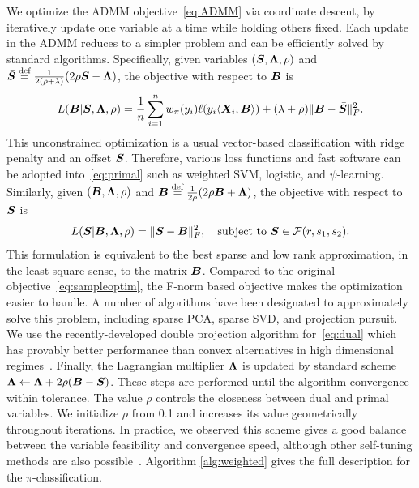 \documentclass[11pt]{article}
\theoremstyle{plain}
\theoremstyle{definition}
\begin{document}
We optimize the ADMM objective~\eqref{eq:ADMM} via coordinate descent, by iteratively update one variable at a time while holding others fixed. Each update in the ADMM reduces to a simpler problem and can be efficiently solved by standard algorithms. Specifically, given variables $(\bm S,\bm{\Lambda},\rho)$ and $\bar {\bm S}\stackrel{\text{def}}{=}{1\over 2(\rho+\lambda)}(2\rho\bm S-\bm{\Lambda})$, the objective with respect to $\bm B$ is
\begin{align}\label{eq:primal}
L(\bm B|\bm S,\bm{\Lambda},\rho)={1\over n}\sum_{i=1}^n w_\pi(y_i)\ell(y_i\langle\bm X_i,\bm B\rangle)+(\lambda+\rho)\lVert\bm B-\bar {\bm S}\rVert_F^2.
\end{align}
This unconstrained optimization is a usual vector-based classification with ridge penalty and an offset $\bar {\bm S}$. Therefore, various loss functions and fast software can be adopted into~\eqref{eq:primal} such as weighted SVM, logistic, and $\psi$-learning. Similarly, given $(\bm B,\bm{\Lambda},\rho)$ and $\bar {\bm B}\stackrel{\text{def}}{=}{1\over 2\rho}(2\rho\bm B+\bm{\Lambda})$, the objective with respect to $\bm S$ is
\begin{equation}\label{eq:dual}
L(\bm S|\bm B,\bm{\Lambda},\rho)=\lVert\bm S-\bar {\bm B}\rVert_F^2,\quad \text{subject to }\bm S\in\mathcal{F}(r,s_1,s_2).
\end{equation}
This formulation is equivalent to the best sparse and low rank approximation, in the least-square sense, to the matrix $\bm B$. Compared to the original objective~\eqref{eq:sampleoptim}, the F-norm based objective makes the optimization easier to handle. A number of algorithms have been designated to approximately solve this problem, including sparse PCA, sparse SVD, and projection pursuit. We use the recently-developed double projection algorithm for~\eqref{eq:dual} which has provably better performance than convex alternatives in high dimensional regimes~\citep{yang2016rate}. Finally, the Lagrangian multiplier $\bm{\Lambda}$ is updated by standard scheme $\bm{\Lambda}\leftarrow\bm{\Lambda}+2\rho(\bm B-\bm S)$.  These steps are performed until the algorithm convergence within tolerance. The value $\rho$ controls the closeness between dual and primal variables. We initialize $\rho$ from 0.1 and increases its value geometrically throughout iterations. In practice, we observed this scheme gives a good balance between the variable feasibility and convergence speed, although other self-tuning methods are also possible~\citep{parikh2014proximal}. Algorithm \ref{alg:weighted} gives the full description for the $\pi$-classification. 
\end{document}
